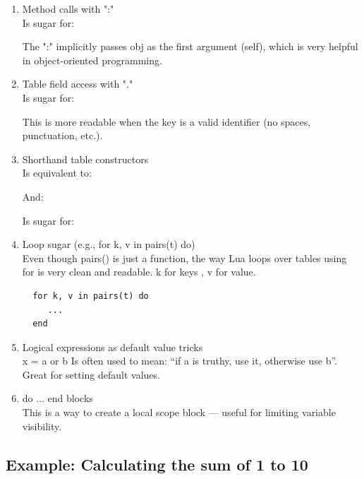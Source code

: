    \begin{enumerate}
  \item  Method calls with ":"\\
  Is sugar for: 

 The ":" implicitly passes obj as the first argument (self), which is very helpful in object-oriented programming.


  \item   Table field access with "."\\
    Is sugar for: 

  This is more readable when the key is a valid identifier (no spaces, punctuation, etc.).

  \item Shorthand table constructors\\
    Is equivalent to: 

  And:

   Is sugar for:  

  \item Loop sugar (e.g., for k, v in pairs(t) do)\\
  Even though pairs() is just a function, the way Lua loops over tables using for is very clean and readable. k for keys , v for value.

\begin{mybox}
\begin{verbatim}
  for k, v in pairs(t) do
     ...
  end
\end{verbatim}
\end{mybox}


 \item  Logical expressions as default value tricks\\
 x = a or b
 Is often used to mean: “if a is truthy, use it, otherwise use b”. Great for setting default values.

 \item  do ... end blocks\\
 This is a way to create a local scope block — useful for limiting variable visibility.
\end{enumerate}

\subsection{Example: Calculating the sum of 1 to 10}
\label{sub:calculating_the_sum}

